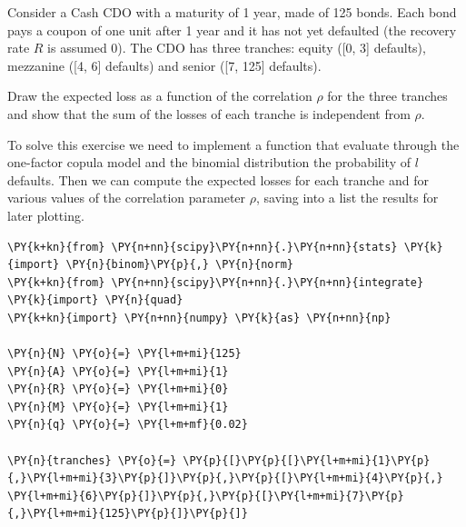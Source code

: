 \begin{Exercise}[title={(Cash CDO)}]
Consider a Cash CDO with a maturity of 1 year, made of 125 bonds. 
Each bond pays a coupon of one unit after 1 year and it has not yet defaulted
(the recovery rate $R$ is assumed 0). The CDO has three tranches: equity ([0, 3] defaults), mezzanine ([4, 6] defaults) 
and senior ([7, 125] defaults).

Draw the expected loss as a function of the correlation $\rho$ for the three tranches and 
show that the sum of the losses of each tranche is independent from $\rho$.
\end{Exercise}
\begin{Answer}	
To solve this exercise we need to implement a function that evaluate through the one-factor copula model and the binomial distribution the probability of $l$ defaults.
Then we can compute the expected losses for each tranche and for various values of the correlation parameter $\rho$, saving into a list the results for later plotting.

\begin{tcolorbox}[size=fbox, boxrule=1pt, colback=cellbackground, colframe=cellborder]
\begin{Verbatim}[commandchars=\\\{\}]
\PY{k+kn}{from} \PY{n+nn}{scipy}\PY{n+nn}{.}\PY{n+nn}{stats} \PY{k}{import} \PY{n}{binom}\PY{p}{,} \PY{n}{norm}
\PY{k+kn}{from} \PY{n+nn}{scipy}\PY{n+nn}{.}\PY{n+nn}{integrate} \PY{k}{import} \PY{n}{quad}
\PY{k+kn}{import} \PY{n+nn}{numpy} \PY{k}{as} \PY{n+nn}{np}
			
\PY{n}{N} \PY{o}{=} \PY{l+m+mi}{125}
\PY{n}{A} \PY{o}{=} \PY{l+m+mi}{1}
\PY{n}{R} \PY{o}{=} \PY{l+m+mi}{0}
\PY{n}{M} \PY{o}{=} \PY{l+m+mi}{1}
\PY{n}{q} \PY{o}{=} \PY{l+m+mf}{0.02}
			
\PY{n}{tranches} \PY{o}{=} \PY{p}{[}\PY{p}{[}\PY{l+m+mi}{1}\PY{p}{,}\PY{l+m+mi}{3}\PY{p}{]}\PY{p}{,}\PY{p}{[}\PY{l+m+mi}{4}\PY{p}{,} \PY{l+m+mi}{6}\PY{p}{]}\PY{p}{,}\PY{p}{[}\PY{l+m+mi}{7}\PY{p}{,}\PY{l+m+mi}{125}\PY{p}{]}\PY{p}{]}
\end{Verbatim}
\end{tcolorbox}


\end{Answer}
